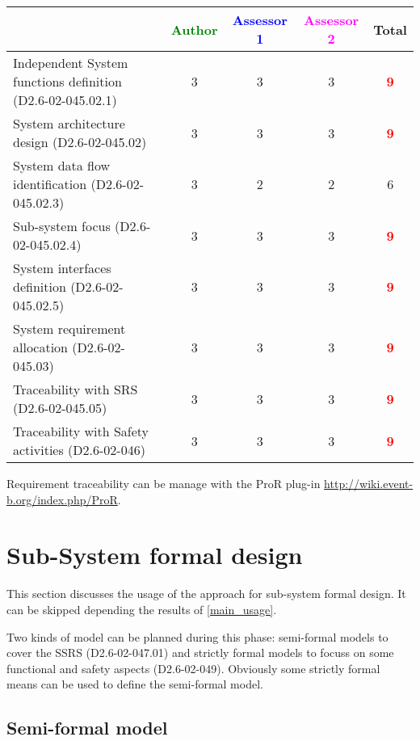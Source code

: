 \begin{tabular}{|l | c | c | c | c|}
\hline
& \textcolor{green}{Author} & \textcolor{blue}{Assessor 1} & \textcolor{magenta}{Assessor 2} & Total \\
\hline
Independent System functions definition (D2.6-02-045.02.1)  & 3    & 3    & 3    & \textcolor{red}{\textbf{9}} \\
\hline 
System architecture design (D2.6-02-045.02) & 3    & 3    & 3    & \textcolor{red}{\textbf{9}} \\
\hline
System data flow identification (D2.6-02-045.02.3)  & 3    & 2    & 2    &  6 \\
\hline
Sub-system focus (D2.6-02-045.02.4)  & 3    & 3    & 3    & \textcolor{red}{\textbf{9}} \\
\hline
System interfaces definition (D2.6-02-045.02.5)  & 3    & 3    & 3    & \textcolor{red}{\textbf{9}}  \\
\hline
System requirement allocation (D2.6-02-045.03)  & 3    & 3    & 3    & \textcolor{red}{\textbf{9}} \\
\hline
Traceability with SRS (D2.6-02-045.05)  & 3    & 3    & 3    & \textcolor{red}{\textbf{9}} \\
\hline
Traceability with Safety activities (D2.6-02-046)  & 3    & 3    & 3    & \textcolor{red}{\textbf{9}} \\
\hline
\end{tabular}

\begin{author_comment}
Requirement traceability can be manage with the ProR plug-in \url{http://wiki.event-b.org/index.php/ProR}.
\end{author_comment}

\section{Sub-System formal design}
This section discusses the usage of the approach for sub-system formal design.
It can be skipped depending the results of \ref{main_usage}.

Two kinds of model can be planned during this phase: semi-formal models to  cover the SSRS (D2.6-02-047.01) and strictly formal  models to  focuss on some functional and safety aspects (D2.6-02-049).  Obviously some strictly  formal means can be used to define the semi-formal  model.

\subsection{Semi-formal model}



